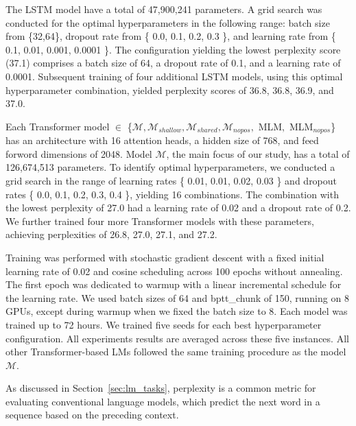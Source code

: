 The LSTM model have a total of 47,900,241 parameters. A grid search was conducted for the optimal hyperparameters in the following range: batch size from \{32,64\}, dropout rate from \{ 0.0, 0.1, 0.2, 0.3 \}, and learning rate from \{ 0.1, 0.01, 0.001, 0.0001 \}. The configuration yielding the lowest perplexity score (37.1) comprises a batch size of 64, a dropout rate of 0.1, and a learning rate of 0.0001. Subsequent training of four additional LSTM models, using this optimal hyperparameter combination, yielded perplexity scores of 36.8, 36.8, 36.9, and 37.0.

Each Transformer model $\in$ \{$\mathcal{M},\mathcal{M}_{shallow},\mathcal{M}_{shared},\mathcal{M}_{nopos},$ MLM$, $ MLM$_{nopos}$\} has an architecture with 16 attention heads, a hidden size of 768, and feed forword dimensions of 2048. Model $\mathcal{M}$, the main focus of our study, has a total of 126,674,513 parameters. To identify optimal hyperparameters, we conducted a grid search in the range of learning rates \{ 0.01, 0.01, 0.02, 0.03 \} and dropout rates \{ 0.0, 0.1, 0.2, 0.3, 0.4 \}, yielding 16 combinations. The combination with the lowest perplexity of 27.0 had a learning rate of 0.02 and a dropout rate of 0.2. We further trained four more Transformer models with these parameters, achieving perplexities of 26.8, 27.0, 27.1, and 27.2.

Training was performed with stochastic gradient descent with a fixed initial learning rate of 0.02 and cosine scheduling across 100 epochs without annealing. The first epoch was dedicated to warmup with a linear incremental schedule for the learning rate. We used batch sizes of 64 and bptt\_chunk of 150, running on 8 GPUs, except during warmup when we fixed the batch size to 8. Each model was trained up to 72 hours. We trained five seeds for each best hyperparameter configuration. All experiments results are averaged across these five instances. All other Transformer-based LMs followed the same training procedure as the model $\mathcal{M}$.


 \label{sec:ppl_lm}

As discussed in Section~\ref{sec:lm_tasks}, perplexity is a common metric for evaluating conventional language models, which predict the next word in a sequence based on the preceding context. 

